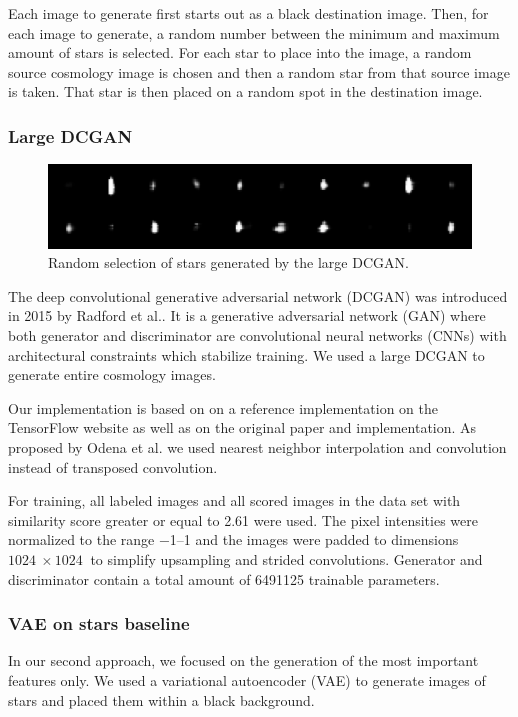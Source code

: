 \documentclass[10pt,conference,compsocconf]{IEEEtran}
\begin{document}
Each image to generate first starts out as a black destination image. Then, for each image to generate, a random number between the minimum and maximum amount of stars is selected. For each star to place into the image, a random source cosmology image is chosen and then a random star from that source image is taken. That star is then placed on a random spot in the destination image.

\subsubsection{Large DCGAN}

\begin{figure}%
    \centering
    \includegraphics[width=\columnwidth]{assets/star_ensemble_large_resized.png}
    \caption{Random selection of stars generated by the large DCGAN.}
    \label{fig:dcgan_stars}
\end{figure}

The deep convolutional generative adversarial network (DCGAN) was introduced in 2015 by Radford et al.\@ \cite{Radford}. It is a generative adversarial network (GAN) where both generator and discriminator are convolutional neural networks (CNNs) with architectural constraints which stabilize training. We used a large DCGAN to generate entire cosmology images. 

Our implementation is based on on a reference implementation on the TensorFlow website \cite{dcgantf} as well as on the original paper and implementation. As proposed by Odena et al.\@ \cite{Odena} we used nearest neighbor interpolation and convolution instead of transposed convolution.

For training, all labeled images and all scored images in the data set with similarity score greater or equal to \SI{2.61}{} were used. The pixel intensities were normalized to the range \SIrange{-1}{1}{} and the images were padded to dimensions $\SI{1024}{}\times\SI{1024}{}$ to simplify upsampling and strided convolutions. Generator and discriminator contain a total amount of \SI{6491125}{} trainable parameters.

\subsubsection{VAE on stars baseline} %
In our second approach, we focused on the generation of the most important features only. We used a variational autoencoder (VAE) to generate images of stars and placed them within a black background. 
\end{document}
